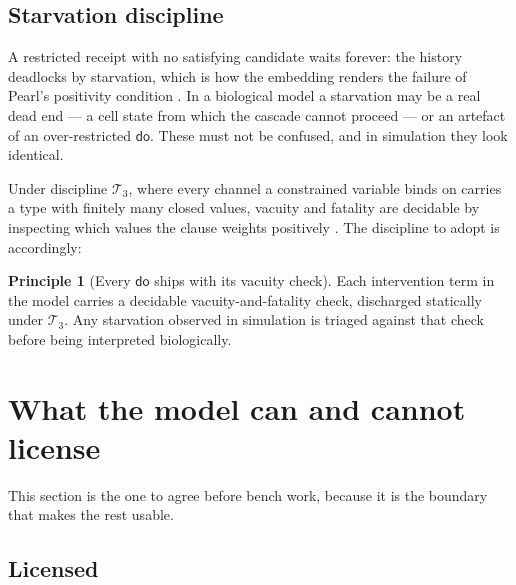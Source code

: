 \documentclass[11pt,a4paper]{article}
\theoremstyle{plain}
\theoremstyle{definition}
\newtheorem{principle}[theorem]{Principle}
\theoremstyle{remark}
\newcommand{\dok}{\textsf{do}}
\begin{document}
\subsection{Starvation discipline}

A restricted receipt with no satisfying candidate waits forever: the history
deadlocks by starvation, which is how the embedding renders the failure of
Pearl's positivity condition \cite[Rem.~3.8]{Interventions}. In a biological
model a starvation may be a real dead end --- a cell state from which the
cascade cannot proceed --- or an artefact of an over-restricted $\dok$. These
must not be confused, and in simulation they look identical.

Under discipline $\mathcal{T}_3$, where every channel a constrained variable
binds on carries a type with finitely many closed values, vacuity and fatality
are decidable by inspecting which values the clause weights positively
\cite[Def.~4.5]{Interventions}. The discipline to adopt is accordingly:

\begin{principle}[Every $\dok$ ships with its vacuity check]\label{prin:vac}
Each intervention term in the model carries a decidable vacuity-and-fatality
check, discharged statically under $\mathcal{T}_3$. Any starvation observed in
simulation is triaged against that check before being interpreted
biologically.
\end{principle}

\section{What the model can and cannot license}\label{sec:license}

This section is the one to agree before bench work, because it is the
boundary that makes the rest usable.

\subsection{Licensed}
\end{document}
